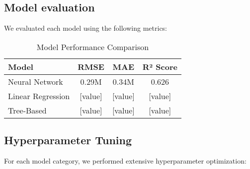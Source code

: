 \documentclass[twocolumn]{article}
\begin{document}
\subsection{Model evaluation}
We evaluated each model using the following metrics:
\begin{table}[H]
    \centering
    \caption{Model Performance Comparison}
    \begin{tabular}{lccc}
        \toprule
        Model & RMSE & MAE & R² Score \\
        \midrule
        Neural Network & 0.29M & 0.34M & 0.626 \\
        Linear Regression & [value] & [value] & [value] \\
        Tree-Based & [value] & [value] & [value] \\
        \bottomrule
    \end{tabular}
    \label{tab:model_comparison}
\end{table}

\subsection{Hyperparameter Tuning}
For each model category, we performed extensive hyperparameter optimization:
\end{document}
